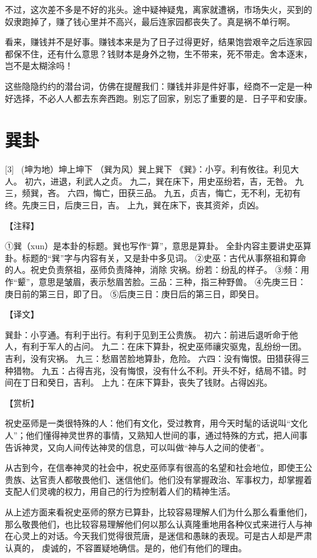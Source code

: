 \documentclass[12pt,UTF8]{ctexbook}
\begin{document}
不过，这次差不多是不好的兆头。途中疑神疑鬼，离家就遭祸，市场失火，买到的奴隶跑掉了，赚了钱心里并不高兴，最后连家园都丧失了。真是祸不单行啊。

看来，赚钱并不是好事。赚钱本来是为了日子过得更好，结果饱尝艰辛之后连家园都保不住，还有什么意思？钱财本是身外之物，生不带来，死不带走。舍本逐末，岂不是太糊涂吗！

这些隐隐约约的潜台词，仿佛在提醒我们：赚钱并非是件好事，经商不一定是一种好选择，不必人人都去东奔西跑。别忘了回家，别忘了重要的是．日子平和安康。

\chapter{巽卦}
[3] \ (坤为地）坤上坤下
（巽为风）巽上巽下
《巽》：小亨。利有攸往。利见大人。
初六，进退，利武人之贞。
九二，巽在床下，用史巫纷若，吉，无咎。
九三，频巽，吝。
六四，悔亡，田获三品。
九五，贞吉，悔亡，无不利，无初有终。先庚三日，后庚三日，吉。
上九，巽在床下，丧其资斧，贞凶。

【注释】

①巽（xun）是本卦的标题。巽也写作“算”，意思是算卦。 全卦内容主要讲史巫算卦。标题的“巽”字与内容有关，又是卦中多见词。
②史巫：古代从事祭祖和算命的人。祝史负责祭祖，巫师负责降神，消除 灾祸。纷若：纷乱的样子。
③频：用作“颦”，意思是皱眉，表示愁眉苦脸。三品：三种，指三种野兽。
④先庚三日：庚日前的第三日，即了日。
⑤后庚三日：庚日后的第三日，即癸日。

【译文】

巽卦：小亨通。有利于出行。有利于见到王公贵族。
初六：前进后退听命于他人，有利于军人的占问。
九二：在床下算卦，祝史巫师禳灾驱鬼，乱纷纷一团。吉利，没有灾祸。
九三：愁眉苦脸地算卦，危险。
六四：没有悔恨。田猎获得三种猎物。
九五：占得吉兆，没有悔恨，没有什么不利。开头不好，结局不错。时间在丁日和癸日，吉利。
上九：在床下算卦，丧失了钱财。占得凶兆。

【赏析】

祝史巫师是一类很特殊的人：他们有文化，受过教育，用今天时髦的话说叫“文化人”；他们懂得神灵世界的事情，又熟知人世间的事，通过特殊的方式，把人间事告诉神灵，又向人间传达神灵的信息，可以叫做“神与人之间的使者”。

从古到今，在信奉神灵的社会中，祝史巫师享有很高的名望和社会地位，即使王公贵族、达官责人都敬畏他们、迷信他们。他们没有掌握政治、军事权力，却掌握着支配人们灵魂的权力，用自己的行为控制着人们的精神生活。

从上述方面来看祝史巫师的祭方已算卦，比较容易理解人们为什么那么看重他们，那么敬畏他们，也比较容易理解他们何以那么认真隆重地用各种仪式来进行人与神在心灵上的对话。今天我们觉得很荒唐，是迷信和愚昧的表现。可是古人却是严肃认真的， 虔诚的，不容置疑地确信。是的，他们有他们的理由。
\end{document}
